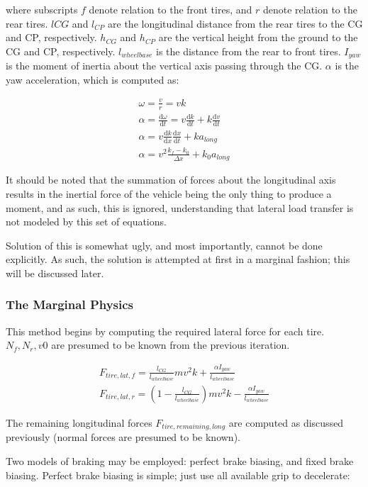 \documentclass{article}
\def\D{\mathrm{d}}
\begin{document}
where subscripts $f$ denote relation to the front tires, and $r$ denote relation to the rear tires. $l{CG}$ and $l_{CP}$ are the longitudinal distance from the rear tires to the CG and CP, respectively. $h_{CG}$ and $h_{CP}$ are the vertical height from the ground to the CG and CP, respectively. $l_{wheelbase}$ is the distance from the rear to front tires. $I_{yaw}$ is the moment of inertia about the vertical axis passing through the CG. $\alpha$ is the yaw acceleration, which is computed as:

\begin{align}
	\omega = \frac{v}{r} = v k \\
	\alpha = \frac{\D \omega}{\D t} = v \frac{\D k}{\D t} + k \frac{\D v}{\D t} \\
	\alpha = v \frac{\D k}{\D x} \frac{\D x}{\D t} + k a_{long} \\
	\alpha = v^2 \frac{k_f - k_0}{\Delta x} + k_0 a_{long}
\end{align}

It should be noted that the summation of forces about the longitudinal axis results in the inertial force of the vehicle being the only thing to produce a moment, and as such, this is ignored, understanding that lateral load transfer is not modeled by this set of equations.

Solution of this is somewhat ugly, and most importantly, cannot be done explicitly. As such, the solution is attempted at first in a marginal fashion; this will be discussed later.

\subsubsection{The Marginal Physics}
This method begins by computing the required lateral force for each tire. $N_f, N_r, v0$ are presumed to be known from the previous iteration.

\begin{align}
	F_{tire,lat,f} = \frac{l_{CG}}{l_{wheelbase}} m v^2 k + \frac{\alpha I_{yaw}}{l_{wheelbase}}  \\ 
	F_{tire,lat,r} = (1-\frac{l_{CG}}{l_{wheelbase}}) m v^2 k - \frac{\alpha I_{yaw}}{l_{wheelbase}}
\end{align}

The remaining longitudinal forces $F_{tire,remaining,long}$ are computed as discussed previously (normal forces are presumed to be known). 

Two models of braking may be employed: perfect brake biasing, and fixed brake biasing. Perfect brake biasing is simple; just use all available grip to decelerate:
\end{document}
